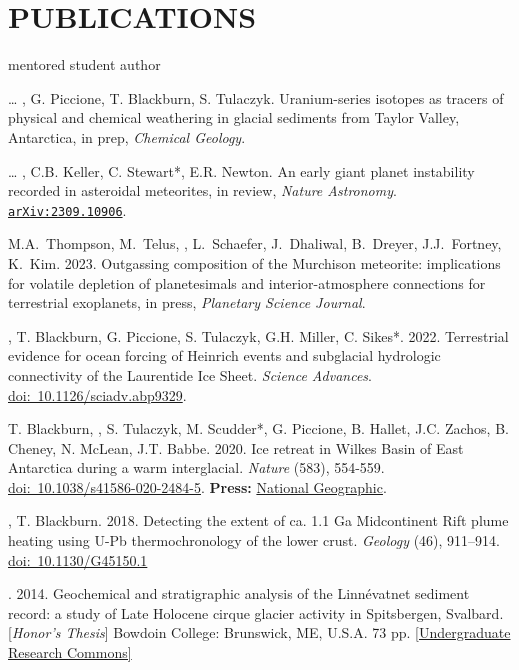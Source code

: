 \section*{PUBLICATIONS}
\hfill* mentored student author
\newcommand{\inprep}[1]{in prep, \textit{#1}}
\newcommand{\submitted}[1]{submitted, \textit{#1}}
\newcommand{\inreview}[1]{in review, \textit{#1}}
\newcommand{\inpress}[1]{in press, \textit{#1}}
\newcommand{\doi}[1]{\href{https://doi.org/#1}{doi:~#1}}
\newcommand{\arxiv}[1]{\href{https://arxiv.org/abs/#1}{\texttt{arXiv:#1}}}

\begin{etaremune} [itemsep=4pt, leftmargin=3ex]
\item[\dots] \ghedwards, G. Piccione, T. Blackburn,  S. Tulaczyk. Uranium-series isotopes as tracers of physical and chemical weathering in glacial sediments from Taylor Valley, Antarctica, \inprep{Chemical Geology}.
\item[\dots] \ghedwards, C.B. Keller, C. Stewart*, E.R. Newton. An early giant planet instability recorded in asteroidal meteorites, \inreview{Nature Astronomy}. \arxiv{2309.10906}.
\item M.A.~Thompson, M.~Telus, \ghedwards, L.~Schaefer, J.~Dhaliwal, B.~Dreyer, J.J.~Fortney, K.~Kim. 2023. Outgassing composition of the Murchison meteorite: implications for volatile depletion of planetesimals and interior-atmosphere connections for terrestrial exoplanets, \inpress{Planetary Science Journal}. 
\item \ghedwards, T. Blackburn, G. Piccione, S. Tulaczyk, G.H. Miller, C. Sikes*. 2022. Terrestrial evidence for ocean forcing of Heinrich events and subglacial hydrologic connectivity of the Laurentide Ice Sheet. \textit{Science Advances}. \doi{10.1126/sciadv.abp9329}.
\item T. Blackburn, \ghedwards, S. Tulaczyk, M. Scudder*, G. Piccione, B. Hallet, J.C. Zachos, B. Cheney, N. McLean, J.T. Babbe. 2020. Ice retreat in Wilkes Basin of East Antarctica during a warm interglacial. \textit{Nature} (583), 554-559. \doi{10.1038/s41586-020-2484-5}. \textbf{Press:} \href{https://www.nationalgeographic.com/science/2020/07/east-antarctic-ice-sheet-more-vulnerable-to-melting-than-thought/}{National Geographic}.
\item \ghedwards, T. Blackburn. 2018. Detecting the extent of ca. 1.1 Ga Midcontinent Rift plume heating using U-Pb thermochronology of the lower crust. \textit{Geology} (46), 911–914. \doi{10.1130/G45150.1} 
\item \ghedwards. 2014. Geochemical and stratigraphic analysis of the Linnévatnet sediment record: a study of Late Holocene cirque glacier activity in Spitsbergen, Svalbard. [\textit{Honor’s Thesis}] Bowdoin College: Brunswick, ME, U.S.A. 73 pp. \href{https://digitalcommons.bowdoin.edu/honorsprojects/12/}{[Undergraduate Research Commons]}
\end{etaremune}